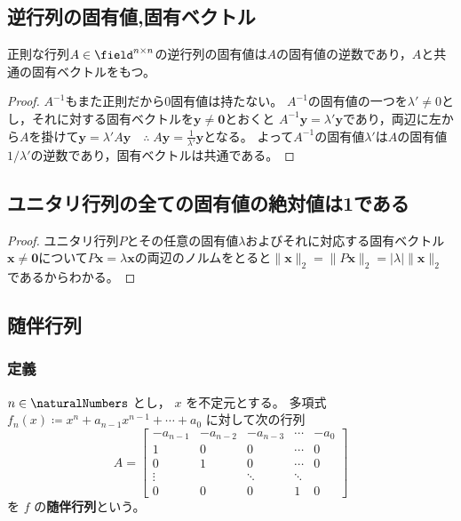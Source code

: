         \subsection{逆行列の固有値,固有ベクトル}
            \begin{shadebox}
                正則な行列$A\in\field^{n\times n}$の逆行列の固有値は$A$の固有値の逆数であり，$A$と共通の固有ベクトルをもつ。
            \end{shadebox}
            \begin{proof}
                \quad\par
                $A^{-1}$もまた正則だから0固有値は持たない。
                $A^{-1}$の固有値の一つを$\lambda'\neq0$とし，それに対する固有ベクトルを$\bm{y}\neq\bm{0}$とおくと
                $A^{-1}\bm{y} = \lambda'\bm{y}$であり，両辺に左から$A$を掛けて$\bm{y} = \lambda'A\bm{y}\quad\therefore\;A\bm{y} = \frac{1}{\lambda'}\bm{y}$となる。
                よって$A^{-1}$の固有値$\lambda'$は$A$の固有値$1/\lambda'$の逆数であり，固有ベクトルは共通である。
            \end{proof}
        \subsection{ユニタリ行列の全ての固有値の絶対値は1である}
            \begin{proof}
                \quad\par
                ユニタリ行列$P$とその任意の固有値$\lambda$およびそれに対応する固有ベクトル$\bm{x} \neq \bm{0}$について$P\bm{x} = \lambda\bm{x}$の両辺のノルムをとると$\|\bm{x}\|_2 = \|P\bm{x}\|_2 = |\lambda|\|\bm{x}\|_2$であるからわかる。
            \end{proof}
        \subsection{随伴行列}
            \subsubsection{定義}
                \label{随伴行列の定義}
                $n\in\naturalNumbers$ とし， $x$ を不定元とする。
                多項式 $f_n(x)\coloneq x^n+a_{n-1}x^{n-1}+\dotsb+a_0$ に対して次の行列
                \[
                    A =
                    \begin{bmatrix}
                        -a_{n-1} & -a_{n-2} & -a_{n-3} & \cdots & -a_0 \\
                        1 & 0 & 0 & \cdots & 0 \\
                        0 & 1 & 0 & \cdots & 0 \\
                        \vdots & & \ddots & \ddots \\
                        0 & 0 & 0 & 1 & 0
                    \end{bmatrix}
                \]
                を $f$ の\textbf{随伴行列}という。
